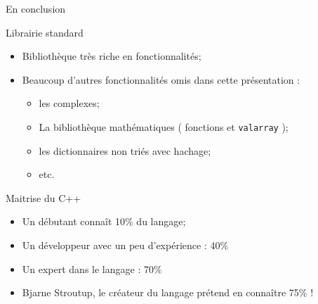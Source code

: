 \documentclass[handout,10pt]{beamer}
\begin{document}
\begin{frame}[fragile]{En conclusion}
\tiny
 \begin{block}{Librairie standard}
  \begin{itemize}
  \item Bibliothèque très riche en fonctionnalités;
  \item Beaucoup d'autres fonctionnalités omis dans cette présentation :
  \begin{itemize}
  \item les complexes;
  \item La bibliothèque mathématiques ( fonctions et \lstinline$valarray$ );
  \item les dictionnaires non triés avec hachage;
  \item etc.
  \end{itemize}
 \end{itemize}
 \end{block}

 \begin{block}{Maitrise du C++}
 \begin{itemize}
  \item Un débutant connaît 10\% du langage;
  \item Un développeur avec un peu d'expérience : 40\%
  \item Un expert dans le langage : 70\%
  \item Bjarne Stroutup, le créateur du langage prétend en connaître 75\% !
 \end{itemize}
 \end{block}

\end{frame}
\end{document}
